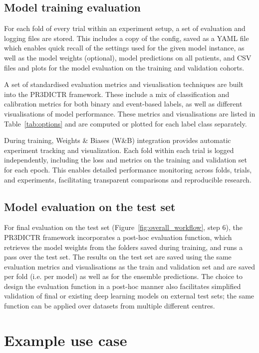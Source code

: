 \documentclass[11pt]{article}
\begin{document}
\subsection{Model training evaluation}

For each fold of every trial within an experiment setup, a set of evaluation and logging files are stored. This includes a copy of the config, saved as a YAML file which enables quick recall of the settings used for the given model instance, as well as the model weights (optional), model predictions on all patients, and CSV files and plots for the model evaluation on the training and validation cohorts.

A set of standardised evaluation metrics and visualisation techniques are built into the PR3DICTR framework. These include a mix of classification and calibration metrics for both binary and event-based labels, as well as different visualisations of model performance. These metrics and visualisations are listed in Table~\ref{tab:options} and are computed or plotted for each label class separately.

During training, Weights \& Biases (W\&B) integration provides automatic experiment tracking and visualization. Each fold within each trial is logged independently, including the loss and metrics on the training and validation set for each epoch. This enables detailed performance monitoring across folds, trials, and experiments, facilitating transparent comparisons and reproducible research.

\subsection{Model evaluation on the test set}

For final evaluation on the test set (Figure~\ref{fig:overall_workflow}, step 6), the PR3DICTR framework incorporates a post-hoc evaluation function, which retrieves the model weights from the folders saved during training, and runs a pass over the test set. The results on the test set are saved using the same evaluation metrics and visualisations as the train and validation set and are saved per fold (i.e. per model) as well as for the ensemble predictions. The choice to design the evaluation function in a post-hoc manner also facilitates simplified validation of final or existing deep learning models on external test sets; the same function can be applied over datasets from multiple different centres.

\section{Example use case}
\end{document}
